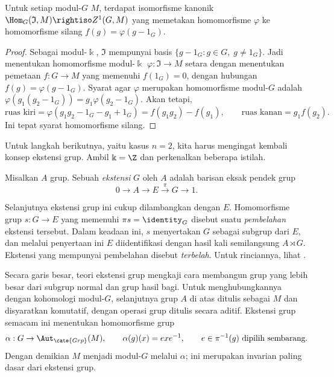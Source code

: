 \begin{proposition}\label{prop:crossed-augmentation}
	Untuk setiap modul-$G$ $M$, terdapat isomorfisme kanonik
	$\Hom_G(\mathfrak{I},M)\rightiso Z^1(G,M)$ yang memetakan homomorfisme
	$\varphi$ ke homomorfisme silang $f(g)=\varphi(g-1_G)$.
\end{proposition}
\begin{proof}
	Sebagai modul-$\Bbbk$, $\mathfrak{I}$ mempunyai basis
	$\{g-1_G:g\in G,\;g\neq1_G\}$. Jadi menentukan homomorfisme modul-$\Bbbk$
	$\varphi:\mathfrak{I}\to M$ setara dengan menentukan pemetaan $f:G\to M$
	yang memenuhi $f(1_G)=0$, dengan hubungan
	$f(g)=\varphi(g-1_G)$. Syarat agar $\varphi$ merupakan homomorfisme
	modul-$G$ adalah
	$\varphi(g_1(g_2-1_G))=g_1\varphi(g_2-1_G)$. Akan tetapi,
	\[ \text{ruas kiri}=\varphi(g_1g_2-1_G-g_1+1_G)
	=f(g_1g_2)-f(g_1),\qquad
	\text{ruas kanan}=g_1f(g_2). \]
	Ini tepat syarat homomorfisme silang.
\end{proof}

Untuk langkah berikutnya, yaitu kasus $n=2$, kita harus mengingat kembali
konsep ekstensi grup. Ambil $\Bbbk=\Z$ dan perkenalkan beberapa istilah.

\begin{definition}\label{def:group-ext}
	Misalkan $A$ grup. Sebuah \emph{ekstensi} $G$ oleh $A$ adalah barisan eksak
	pendek grup \cite[Definisi 4.3.7]{Li1}
	\[ 0\to A\to E\xrightarrow{\pi}G\to1. \]

	Selanjutnya ekstensi grup ini cukup dilambangkan dengan $E$. Homomorfisme grup
	$s:G\to E$ yang memenuhi $\pi s=\identity_G$ disebut suatu
	\emph{pembelahan} ekstensi tersebut. Dalam keadaan ini, $s$ menyertakan $G$
	sebagai subgrup dari $E$, dan melalui penyertaan ini $E$ diidentifikasi
	dengan hasil kali semilangsung $A\rtimes G$. Ekstensi yang mempunyai
	pembelahan disebut \emph{terbelah}. Untuk rinciannya, lihat
	\cite[\S 4.3]{Li1}.
\end{definition}

Secara garis besar, teori ekstensi grup mengkaji cara membangun grup yang lebih
besar dari subgrup normal dan grup hasil bagi. Untuk menghubungkannya dengan
kohomologi modul-$G$, selanjutnya grup $A$ di atas ditulis sebagai $M$ dan
disyaratkan komutatif, dengan operasi grup ditulis secara aditif. Ekstensi
grup semacam ini menentukan homomorfisme grup
\[ \alpha:G\to\Aut_{\cate{Grp}}(M),\qquad
	\alpha(g)(x)=exe^{-1},\qquad e\in\pi^{-1}(g)\ \text{dipilih sembarang}. \]
Dengan demikian $M$ menjadi modul-$G$ melalui $\alpha$; ini merupakan
invarian paling dasar dari ekstensi grup.

